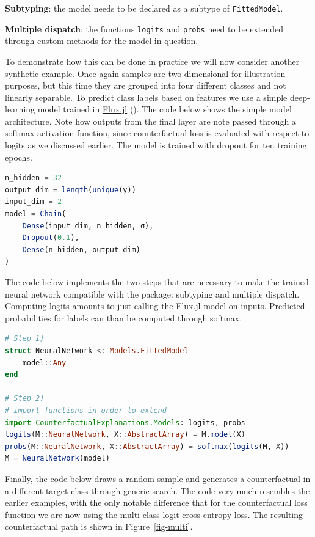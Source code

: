 \documentclass{juliacon}
\begin{document}
\begin{unnumlist}
\item \textbf{Subtyping}: the model needs to be declared as a subtype of \texttt{FittedModel}.
\item \textbf{Multiple dispatch}: the functions \texttt{logits} and \texttt{probs} need to be extended through custom methods for the model in question.
\end{unnumlist}

To demonstrate how this can be done in practice we will now consider
another synthetic example. Once again samples are two-dimensional for
illustration purposes, but this time they are grouped into four
different classes and not linearly separable. To predict class labels
based on features we use a simple deep-learning model trained in
\href{https://fluxml.ai/}{Flux.jl} (\cite{innes2018flux}). The code
below shows the simple model architecture. Note how outputs from the
final layer are note passed through a softmax activation function, since
counterfactual loss is evaluated with respect to logits as we discussed
earlier. The model is trained with dropout for ten training epochs.

\begin{lstlisting}[language = Julia]
n_hidden = 32
output_dim = length(unique(y))
input_dim = 2
model = Chain(
    Dense(input_dim, n_hidden, σ),
    Dropout(0.1),
    Dense(n_hidden, output_dim)
)  
\end{lstlisting}

The code below implements the two steps that are necessary to make the
trained neural network compatible with the package: subtyping and
multiple dispatch. Computing logits amounts to just calling the Flux.jl
model on inputs. Predicted probabilities for labels can than be computed
through softmax.

\begin{lstlisting}[language = Julia]
# Step 1)
struct NeuralNetwork <: Models.FittedModel
    model::Any
end

# Step 2)
# import functions in order to extend
import CounterfactualExplanations.Models: logits, probs 
logits(M::NeuralNetwork, X::AbstractArray) = M.model(X)
probs(M::NeuralNetwork, X::AbstractArray) = softmax(logits(M, X))
M = NeuralNetwork(model)
\end{lstlisting}

Finally, the code below draws a random sample and generates a
counterfactual in a different target class through generic search. The
code very much resembles the earlier examples, with the only notable
difference that for the counterfactual loss function we are now using
the multi-class logit cross-entropy loss. The resulting counterfactual
path is shown in Figure~\ref{fig-multi}.
\end{document}
